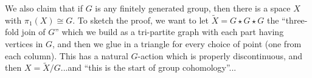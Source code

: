 We also claim that if $G$ is any finitely generated group, then there is a space $X$ with $\pi_1(X)\cong G$. To sketch the proof, we want to let $\tilde{X}=G\star G \star G$ the ``three-fold join of $G$'' which we build as a tri-partite graph with each part having vertices in $G$, and then we glue in a triangle for every choice of point (one from each column). This has a natural $G$-action which is properly discontinuous, and then $X=\tilde{X}/G$...and ``this is the start of group cohomology''...


